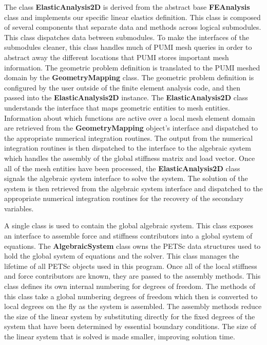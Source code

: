 \documentclass{article}
\begin{document}
The class \textbf{ElasticAnalysis2D} is derived from the abstract base \textbf{FEAnalysis} class and implements our specific linear elastics definition. This class is composed of several components that separate data and methods across logical submodules. This class dispatches data between submodules. To make the interfaces of the submodules cleaner, this class handles much of PUMI mesh queries in order to abstract away the different locations that PUMI stores important mesh information. The geometric problem definition is translated to the PUMI meshed domain by the \textbf{GeometryMapping} class. The geometric problem definition is configured by the user outside of the finite element analysis code, and then passed into the \textbf{ElasticAnalysis2D} instance. The \textbf{ElasticAnalysis2D} class understands the interface that maps geometric entities to mesh entities. Information about which functions are active over a local mesh element domain are retrieved from the \textbf{GeometryMapping} object's interface and dispatched to the appropriate numerical integration routines. The output from the numerical integration routines is then dispatched to the interface to the algebraic system which handles the assembly of the global stiffness matrix and load vector. Once all of the mesh entities have been processed, the \textbf{ElasticAnalysis2D} class signals the algebraic system interface to solve the system. The solution of the system is then retrieved from the algebraic system interface and dispatched to the appropriate numerical integration routines for the recovery of the secondary variables.


A single class is used to contain the global algebraic system. This class exposes an interface to assemble force and stiffness contributors into a global system of equations. The \textbf{AlgebraicSystem} class owns the PETSc data structures used to hold the global system of equations and the solver. This class manages the lifetime of all PETSc objects used in this program. Once all of the local stiffness and force contributors are known, they are passed to the assembly methods. This class defines its own internal numbering for degrees of freedom. The methods of this class take a global numbering degrees of freedom which then is converted to local degrees on the fly as the system is assembled. The assembly methods reduce the size of the linear system by substituting directly for the fixed degrees of the system that have been determined by essential boundary conditions. The size of the linear system that is solved is made smaller, improving solution time.
\end{document}
